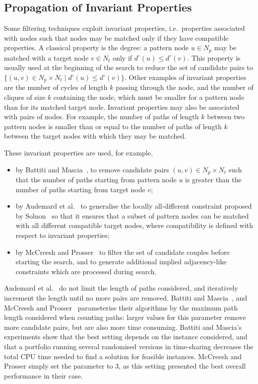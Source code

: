 \documentclass{llncs}
\begin{document}
\subsection{Propagation of Invariant Properties}

Some filtering techniques exploit invariant properties, i.e.\ properties associated with nodes such
that nodes may be matched only if they have compatible properties. A classical property is the
degree: a pattern node $u\in N_p$ may be matched with a target node $v\in N_t$ only if
$d^\circ(u)\leq d^\circ(v)$. This property is usually used at the beginning of the search to reduce
the set of candidate pairs to $\{(u,v)\in N_p\times N_t\;|\;d^\circ(u)\leq d^\circ(v)\}$.  Other
examples of invariant properties are the number of cycles of length $k$ passing through the node,
and the number of cliques of size $k$ containing the node, which must be smaller for a pattern node
than for its matched target node.  Invariant properties may also be associated with pairs of nodes.
For example, the number of paths of length $k$ between two pattern nodes is smaller than or equal to
the number of paths of length $k$ between the target nodes with which they may be matched.

These invariant properties are used, for example,
\begin{itemize}
\item by Battiti and Mascia~\cite{battiti-mascia07}, to remove candidate pairs $(u,v)\in N_p\times
    N_t$ such that the number of paths starting from  pattern node $u$ is greater than the number of
    paths starting from  target node $v$;
\item by Audemard et al.~\cite{Audemard:2014} to generalise the locally all-different constraint
    proposed by Solnon~\cite{Solnon:2010} so that it ensures that a subset of pattern nodes can be
    matched with all different compatible target nodes, where compatibility is defined with respect
    to invariant properties;
\item by McCreesh and Prosser~\cite{McCreesh:2015} to filter the set of candidate couples before
    starting the search, and to generate additional implied adjacency-like constraints which are
    processed during search.
\end{itemize}

Audemard et al.~\cite{Audemard:2014} do not limit the length of paths considered, and
iteratively increment the length until no more pairs are removed. Battiti and Mascia~\cite{battiti-mascia07}, and McCreesh and Prosser~\cite{McCreesh:2015} parameterise their algorithms
by the maximum path length considered when counting paths: larger values for this parameter remove
more candidate pairs, but are also more time consuming. Battiti and Mascia's experiments show that
the best setting depends on the instance considered, and that a portfolio running several randomised
versions in time-sharing decreases the total CPU time needed to find a solution for feasible
instances. McCreesh and Prosser simply set the parameter to 3, as this setting
presented the best overall performance in their case.
\end{document}
